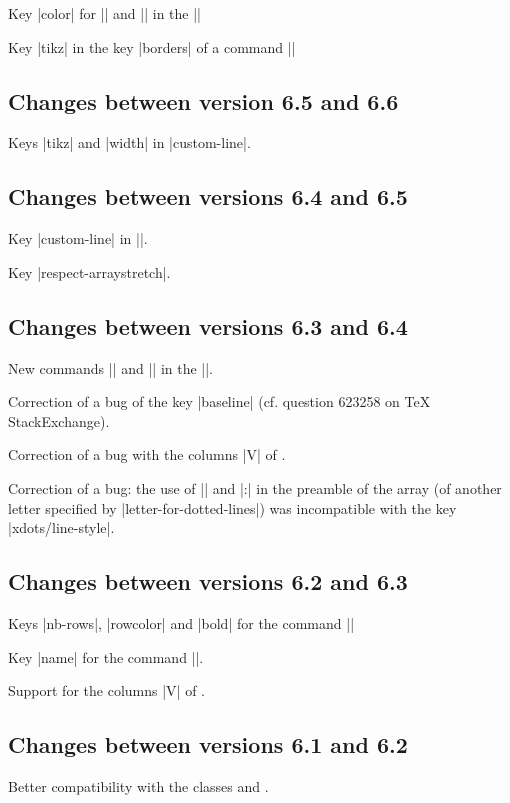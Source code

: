 \documentclass[dvipsnames]{article}%
\begin{document}
Key |color| for |\OverBrace| and |\UnderBrace| in the |\CodeAfter|

Key |tikz| in the key |borders| of a command |\Block|

\subsection*{Changes between version 6.5 and 6.6}

Keys |tikz| and |width| in |custom-line|.

\subsection*{Changes between versions 6.4 and 6.5}

Key |custom-line| in |\NiceMatrixOptions|.

Key |respect-arraystretch|.

\subsection*{Changes between versions 6.3 and 6.4}

New commands |\UnderBrace| and |\OverBrace| in the |\CodeAfter|.

Correction of a bug of the key |baseline| (cf. question 623258 on TeX StackExchange).

Correction of a bug with the columns |V| of .

Correction of a bug: the use of |\hdottedline| and |:| in the preamble of the
array (of another letter specified by |letter-for-dotted-lines|) was
incompatible with the key |xdots/line-style|.

\subsection*{Changes between versions 6.2 and 6.3}

Keys |nb-rows|, |rowcolor| and |bold| for the command |\RowStyle|

Key |name| for the command |\Block|.

Support for the columns |V| of .

\subsection*{Changes between versions 6.1 and 6.2}

Better compatibility with the classes  and .
\end{document}
